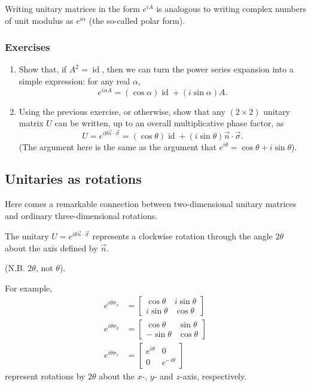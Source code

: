\documentclass{article}
\providecommand{\tightlist}{%
  \setlength{\itemsep}{0pt}\setlength{\parskip}{0pt}}
\begin{document}
Writing unitary matrices in the form \(e^{iA}\) is analogous to writing complex numbers of unit modulus as \(e^{i\alpha}\) (the so-called polar form).

\hypertarget{exercises-2}{%
\subsubsection{Exercises}\label{exercises-2}}

\begin{enumerate}
\def\labelenumi{\arabic{enumi}.}
\tightlist
\item
  Show that, if \(A^2=\operatorname{id}\), then we can turn the power series expansion into a simple expression: for any real \(\alpha\),
  \[
     e^{i\alpha A}
     = (\cos\alpha)\operatorname{id}+ (i\sin\alpha)A.
   \]
\item
  Using the previous exercise, or otherwise, show that any \((2\times 2)\) unitary matrix \(U\) can be written, up to an overall multiplicative phase factor, as
  \[
     U
     = e^{i \theta \vec{n}\cdot\vec{\sigma}}
     = (\cos\theta)\operatorname{id}+ (i\sin\theta)\vec{n}\cdot\vec{\sigma}.
   \]
  (The argument here is the same as the argument that \(e^{i\theta}=\cos\theta +i\sin\theta\)).
\end{enumerate}

\hypertarget{unitaries-as-rotations}{%
\subsection{Unitaries as rotations}\label{unitaries-as-rotations}}

Here comes a remarkable connection between two-dimensional unitary matrices and ordinary three-dimensional rotations.

The unitary \(U = e^{i\theta \vec{n}\cdot\vec{\sigma}}\) represents a clockwise rotation through the angle \(2\theta\) about the axis defined by \(\vec{n}\).

(N.B. \(2\theta\), not \(\theta\)).

For example,
\[
  \begin{aligned}
    e^{i\theta\sigma_x}
    &=
    \begin{bmatrix}
      \cos\theta & i\sin\theta
    \\i\sin\theta & \cos\theta
    \end{bmatrix}
  \\e^{i\theta\sigma_y}
    &=
    \begin{bmatrix}
      \cos\theta & \sin\theta
    \\-\sin\theta & \cos\theta
    \end{bmatrix}
  \\e^{i\theta\sigma_z}
    &= \begin{bmatrix}e^{i\theta}&0\\0&e^{-i\theta}\end{bmatrix}
  \end{aligned}
\]
represent rotations by \(2\theta\) about the \(x\)-, \(y\)- and \(z\)-axis, respectively.
\end{document}
